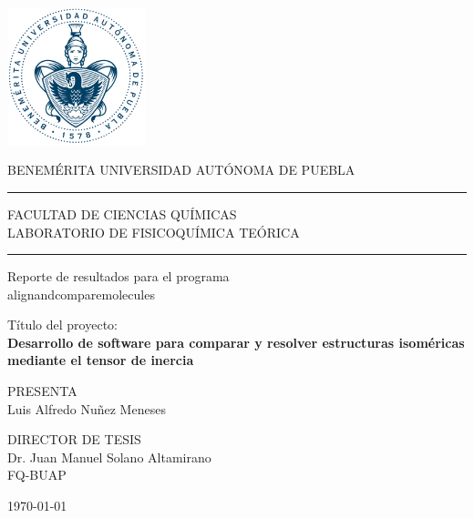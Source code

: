 \documentclass[12pt]{article}
\newcommand\tab[1][0.5cm]{\hspace*{#1}}
\newcommand\vtab[1][0.5cm]{\vspace*{#1}}
\begin{document}
\pagestyle{empty} 

\begin{center}
\includegraphics[width=4cm]{escudo-buap.pdf}

BENEMÉRITA UNIVERSIDAD AUTÓNOMA DE PUEBLA\\
\rule{150mm}{0.1mm}
FACULTAD DE CIENCIAS QUÍMICAS\\
LABORATORIO DE FISICOQUÍMICA TEÓRICA
\rule{150mm}{0.1mm}

\vtab
\Large{Reporte de resultados para el programa \\ alignandcomparemolecules}\\
\vtab[.3cm]

\large{Título del proyecto: \\ \textbf{Desarrollo de software para comparar y resolver estructuras isoméricas mediante el tensor de inercia}}\\
\vtab[0.5cm]

PRESENTA\\
Luis Alfredo Nuñez Meneses \\
\vtab[0.5cm]

\tab[-0.5cm]
\begin{minipage}[t]{0.5\textwidth}
\begin{center}
DIRECTOR DE TESIS  \\
Dr. Juan Manuel Solano Altamirano \\
FQ-BUAP \\
\end{center}
\end{minipage}

\vtab[0.5cm]
\today\\
\end{center}

\newpage

\end{document}
